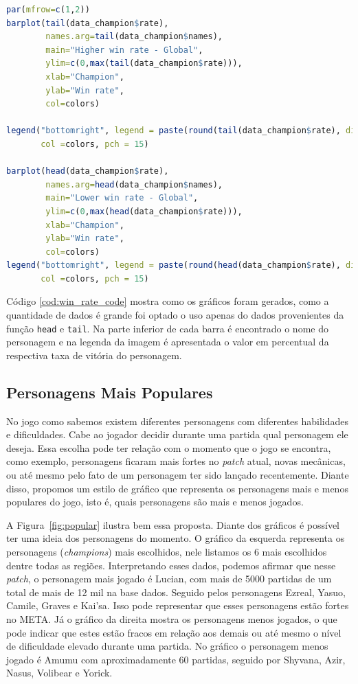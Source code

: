 \documentclass[a4paper]{article}
\begin{document}
\begin{lstlisting}[language=R, caption={Código para gerar os gráfico dos dados},label={cod:win_rate_code}]
par(mfrow=c(1,2))
barplot(tail(data_champion$rate), 
        names.arg=tail(data_champion$names), 
        main="Higher win rate - Global",
        ylim=c(0,max(tail(data_champion$rate))),
        xlab="Champion",
        ylab="Win rate",
        col=colors)

legend("bottomright", legend = paste(round(tail(data_champion$rate), digits = 4)*100, '%'),
       col =colors, pch = 15)

barplot(head(data_champion$rate), 
        names.arg=head(data_champion$names), 
        main="Lower win rate - Global",
        ylim=c(0,max(head(data_champion$rate))),
        xlab="Champion",
        ylab="Win rate",
        col=colors)
legend("bottomright", legend = paste(round(head(data_champion$rate), digits = 4)*100, '%'),
       col =colors, pch = 15)

\end{lstlisting}


Código \ref{cod:win_rate_code} mostra como os gráficos foram gerados, como a quantidade de dados é grande foi optado o uso apenas do dados provenientes da função \texttt{head} e \texttt{tail}. Na parte inferior de cada barra é encontrado o nome do personagem e na legenda da imagem é apresentada o valor em percentual da respectiva taxa de vitória do personagem.
\subsection{Personagens Mais Populares}

No jogo como sabemos existem diferentes personagens com diferentes habilidades e dificuldades. Cabe ao jogador decidir durante uma partida qual personagem ele deseja. Essa escolha pode ter relação com o momento que o jogo se encontra, como exemplo, personagens ficaram mais fortes no \textit{patch} atual, novas mecânicas, ou até mesmo pelo fato de um personagem ter sido lançado recentemente. Diante disso, propomos um estilo de gráfico que representa os personagens mais e menos populares do jogo, isto é, quais personagens são mais e menos jogados.

A Figura~\ref{fig:popular} ilustra bem essa proposta. Diante dos gráficos é possível ter uma ideia dos personagens do momento. O gráfico da esquerda representa os personagens (\textit{champions}) mais escolhidos, nele listamos os 6 mais escolhidos dentre todas as regiões. Interpretando esses dados, podemos afirmar que nesse \textit{patch}, o personagem mais jogado é Lucian, com mais de 5000 partidas de um total de mais de 12 mil na base dados. Seguido pelos personagens Ezreal, Yasuo, Camile, Graves e Kai'sa. Isso pode representar que esses personagens estão fortes no META. Já o gráfico da direita mostra os personagens menos jogados, o que pode indicar que estes estão fracos em relação aos demais ou até mesmo o nível de dificuldade elevado durante uma partida. No gráfico o personagem menos jogado é Amumu com aproximadamente 60 partidas, seguido por Shyvana, Azir, Nasus, Volibear e Yorick.
\end{document}
